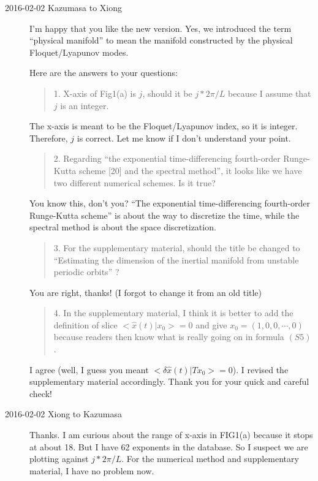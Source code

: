 \begin{description}
\item[2016-02-02 Kazumasa to Xiong]

I'm happy that you like the new version. Yes, we introduced the term
``physical manifold'' to mean the manifold constructed by the physical
Floquet/Lyapunov modes.

Here are the answers to your questions:

\begin{quote}
1. X-axis of Fig1(a) is $j$, should it be $j * 2\pi/L$ because I
assume that $j$ is an integer. \\
\end{quote}
The x-axis is meant to be the Floquet/Lyapunov index, so it is integer. Therefore, $j$ is correct. Let me know if I don't understand your point.

\begin{quote}
2. Regarding ``the exponential time-differencing fourth-order Runge-Kutta
scheme [20] and the spectral method'', it looks like we have two different
numerical schemes. Is it true? \\
\end{quote}
You know this, don't you? ``The exponential time-differencing fourth-order Runge-Kutta scheme'' is about the way to discretize the time, while the spectral method is about the space discretization.

\begin{quote}
3. For the supplementary material, should the title be changed to
``Estimating the dimension of the inertial manifold from
unstable periodic orbits'' ? \\
\end{quote}
You are right, thanks! (I forgot to change it from an old title)

\begin{quote}
4. In the supplementary material, I think it is better to add the
definition of slice $<\hat{x}(t)|x_0> = 0$ and give
$x_0 = (1, 0, 0, \cdots, 0)$ because readers then know what is really
going on in formula $(S5)$.
\end{quote}
I agree (well, I guess you meant $<\delta\hat{x}(t)|T x_0> = 0$). I revised the supplementary material accordingly.
Thank you for your quick and careful check!

\item[2016-02-02 Xiong to Kazumasa]
Thanks.
I am curious about the range of x-axis in FIG1(a)
because it stops at about 18. But I have 62
exponents in the database. So I suspect we are plotting against
$j * 2\pi/L$. For the numerical method and supplementary material,
I have no problem now.


\end{description}
